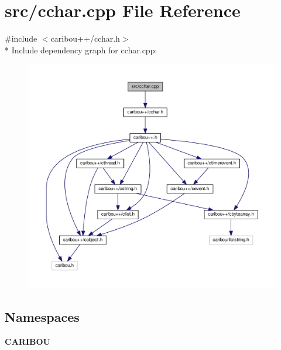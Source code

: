 \section{src/cchar.cpp File Reference}
\label{cchar_8cpp}
{\ttfamily \#include $<$caribou++/cchar.\+h$>$}\\*
Include dependency graph for cchar.\+cpp\+:
\nopagebreak
\begin{figure}[H]
\begin{center}
\leavevmode
\includegraphics[width=350pt]{cchar_8cpp__incl}
\end{center}
\end{figure}
\subsection*{Namespaces}
\begin{DoxyCompactItemize}
\item 
 {\bf C\+A\+R\+I\+B\+OU}
\end{DoxyCompactItemize}
